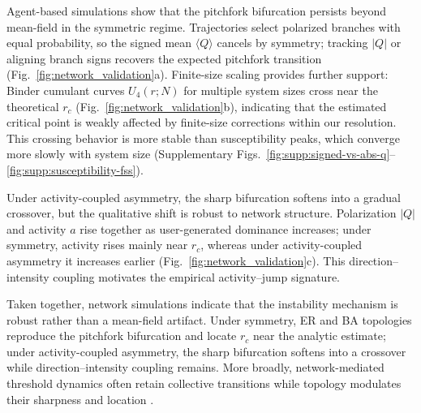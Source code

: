 \documentclass[11pt]{article}
\begin{document}
Agent-based simulations show that the pitchfork bifurcation persists beyond mean-field in the symmetric regime. Trajectories select polarized branches with equal probability, so the signed mean $\langle Q\rangle$ cancels by symmetry; tracking $|Q|$ or aligning branch signs recovers the expected pitchfork transition (Fig.~\ref{fig:network_validation}a). Finite-size scaling provides further support: Binder cumulant curves $U_4(r;N)$ for multiple system sizes cross near the theoretical $r_c$ (Fig.~\ref{fig:network_validation}b), indicating that the estimated critical point is weakly affected by finite-size corrections within our resolution. This crossing behavior is more stable than susceptibility peaks, which converge more slowly with system size (Supplementary Figs.~\ref{fig:supp:signed-vs-abs-q}--\ref{fig:supp:susceptibility-fss}).

Under activity-coupled asymmetry, the sharp bifurcation softens into a gradual crossover, but the qualitative shift is robust to network structure. Polarization $|Q|$ and activity $a$ rise together as user-generated dominance increases; under symmetry, activity rises mainly near $r_c$, whereas under activity-coupled asymmetry it increases earlier (Fig.~\ref{fig:network_validation}c). This direction--intensity coupling motivates the empirical activity--jump signature.

Taken together, network simulations indicate that the instability mechanism is robust rather than a mean-field artifact. Under symmetry, ER and BA topologies reproduce the pitchfork bifurcation and locate $r_c$ near the analytic estimate; under activity-coupled asymmetry, the sharp bifurcation softens into a crossover while direction--intensity coupling remains. More broadly, network-mediated threshold dynamics often retain collective transitions while topology modulates their sharpness and location \citep{Watts2002,Centola2010,Centola2018Tipping,Iacopini2019}.
\end{document}
